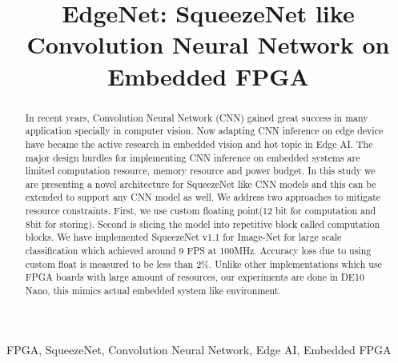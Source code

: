 \documentclass[conference]{IEEEtran}
\begin{document}
\title{EdgeNet: SqueezeNet like Convolution Neural Network on Embedded FPGA\\
}

\author{
\and
{}
\and
{}

}

\maketitle

\begin{abstract}
In recent years, Convolution Neural Network (CNN) gained great success in many application specially in computer vision. Now adapting CNN inference on edge device have became the active research in embedded vision and hot topic in Edge AI. The major design hurdles for implementing CNN inference on embedded systems are limited computation resource, memory resource and power budget. In this study we are presenting a novel architecture for SqueezeNet like CNN models and this can be extended to support any CNN model as well. We address two approaches to mitigate resource constraints. First, we use custom floating point(12 bit for computation and 8bit for storing). Second is slicing the model into repetitive block called computation blocks. We have implemented SqueezeNet v1.1 for Image-Net for large scale classification which achieved around 9 FPS at 100MHz. Accuracy loss due to using custom float is measured to be less than 2\%. Unlike other implementations which use FPGA boards with large amount of resources, our experiments are done in DE10 Nano, this mimics actual embedded system like environment.

\end{abstract}

\begin{IEEEkeywords}
FPGA, SqueezeNet, Convolution Neural Network,  Edge AI,  Embedded FPGA
\end{IEEEkeywords}
\end{document}
